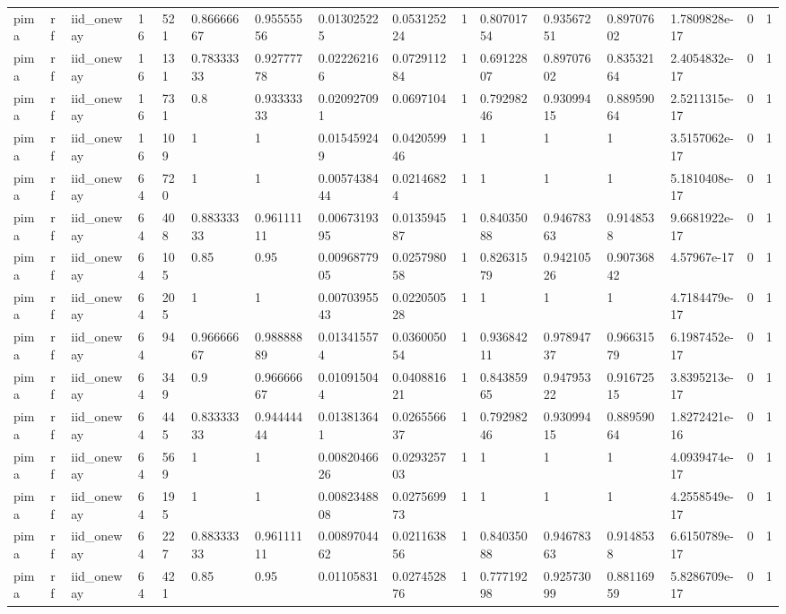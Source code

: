 \begin{tabular}{llllllllllllllll}
pima & rf & iid\_oneway & 16 & 521 & 0.86666667 & 0.95555556 & 0.013025225 & 0.053125224 & 1 & 0.80701754 & 0.93567251 & 0.89707602 & 1.7809828e-17 & 0 & 1 \\
pima & rf & iid\_oneway & 16 & 131 & 0.78333333 & 0.92777778 & 0.022262166 & 0.072911284 & 1 & 0.69122807 & 0.89707602 & 0.83532164 & 2.4054832e-17 & 0 & 1 \\
pima & rf & iid\_oneway & 16 & 731 & 0.8 & 0.93333333 & 0.020927091 & 0.0697104 & 1 & 0.79298246 & 0.93099415 & 0.88959064 & 2.5211315e-17 & 0 & 1 \\
pima & rf & iid\_oneway & 16 & 109 & 1 & 1 & 0.015459249 & 0.042059946 & 1 & 1 & 1 & 1 & 3.5157062e-17 & 0 & 1 \\
pima & rf & iid\_oneway & 64 & 720 & 1 & 1 & 0.0057438444 & 0.02146824 & 1 & 1 & 1 & 1 & 5.1810408e-17 & 0 & 1 \\
pima & rf & iid\_oneway & 64 & 408 & 0.88333333 & 0.96111111 & 0.0067319395 & 0.013594587 & 1 & 0.84035088 & 0.94678363 & 0.9148538 & 9.6681922e-17 & 0 & 1 \\
pima & rf & iid\_oneway & 64 & 105 & 0.85 & 0.95 & 0.0096877905 & 0.025798058 & 1 & 0.82631579 & 0.94210526 & 0.90736842 & 4.57967e-17 & 0 & 1 \\
pima & rf & iid\_oneway & 64 & 205 & 1 & 1 & 0.0070395543 & 0.022050528 & 1 & 1 & 1 & 1 & 4.7184479e-17 & 0 & 1 \\
pima & rf & iid\_oneway & 64 & 94 & 0.96666667 & 0.98888889 & 0.013415574 & 0.036005054 & 1 & 0.93684211 & 0.97894737 & 0.96631579 & 6.1987452e-17 & 0 & 1 \\
pima & rf & iid\_oneway & 64 & 349 & 0.9 & 0.96666667 & 0.010915044 & 0.040881621 & 1 & 0.84385965 & 0.94795322 & 0.91672515 & 3.8395213e-17 & 0 & 1 \\
pima & rf & iid\_oneway & 64 & 445 & 0.83333333 & 0.94444444 & 0.013813641 & 0.026556637 & 1 & 0.79298246 & 0.93099415 & 0.88959064 & 1.8272421e-16 & 0 & 1 \\
pima & rf & iid\_oneway & 64 & 569 & 1 & 1 & 0.0082046626 & 0.029325703 & 1 & 1 & 1 & 1 & 4.0939474e-17 & 0 & 1 \\
pima & rf & iid\_oneway & 64 & 195 & 1 & 1 & 0.0082348808 & 0.027569973 & 1 & 1 & 1 & 1 & 4.2558549e-17 & 0 & 1 \\
pima & rf & iid\_oneway & 64 & 227 & 0.88333333 & 0.96111111 & 0.0089704462 & 0.021163856 & 1 & 0.84035088 & 0.94678363 & 0.9148538 & 6.6150789e-17 & 0 & 1 \\
pima & rf & iid\_oneway & 64 & 421 & 0.85 & 0.95 & 0.01105831 & 0.027452876 & 1 & 0.77719298 & 0.92573099 & 0.88116959 & 5.8286709e-17 & 0 & 1 \\

\end{tabular}
